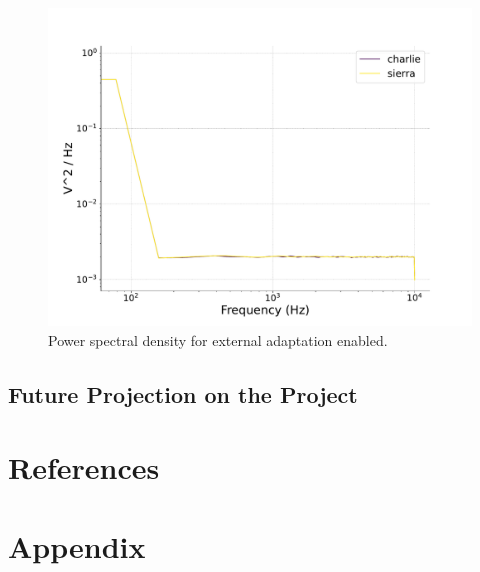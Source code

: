 \documentclass[a4paper,12pt]{article}
\begin{document}
\begin{figure}[htb!] 
    \centering
    \includegraphics[width=\linewidth]{nu_ext_76PSD_homeostasis_foxtrot.pdf}
    \caption{Power spectral density for external adaptation enabled.}
    \label{foxtrot76PSD}
\end{figure}

\subsection{Future Projection on the Project}

\section{References}


\section{Appendix}
\end{document}
